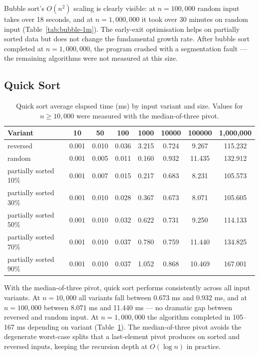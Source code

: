 \documentclass[11pt,a4paper]{article}
\begin{document}
Bubble sort's \(O(n^2)\) scaling is clearly visible: at \(n=100{,}000\) random input takes over 18 seconds, and at \(n=1{,}000{,}000\) it took over 30 minutes on random input (Table~\ref{tab:bubble-1m}). The early-exit optimisation helps on partially sorted data but does not change the fundamental growth rate. After bubble sort completed at \(n=1{,}000{,}000\), the program crashed with a segmentation fault --- the remaining algorithms were not measured at this size.

\subsection{Quick Sort}
\begin{table}[H]
\centering
\footnotesize
\begin{tabular}{lccccccc}
\toprule
Variant & 10 & 50 & 100 & 1000 & 10000 & 100000 & 1{,}000{,}000 \\
\midrule
reversed & 0.001 & 0.010 & 0.036 & 3.215 & 0.724 & 9.267 & 115.232 \\
random & 0.001 & 0.005 & 0.011 & 0.160 & 0.932 & 11.435 & 132.912 \\
partially sorted 10\% & 0.001 & 0.007 & 0.015 & 0.217 & 0.683 & 8.231 & 105.573 \\
partially sorted 30\% & 0.001 & 0.010 & 0.028 & 0.367 & 0.673 & 8.071 & 105.605 \\
partially sorted 50\% & 0.001 & 0.010 & 0.032 & 0.622 & 0.731 & 9.250 & 114.133 \\
partially sorted 70\% & 0.001 & 0.010 & 0.037 & 0.780 & 0.759 & 11.440 & 134.825 \\
partially sorted 90\% & 0.001 & 0.010 & 0.037 & 1.052 & 0.868 & 10.469 & 167.001 \\
\bottomrule
\end{tabular}
\caption{Quick sort average elapsed time (ms) by input variant and size. Values for \(n \geq 10{,}000\) were measured with the median-of-three pivot.}
\label{tab:quick-results}
\end{table}

With the median-of-three pivot, quick sort performs consistently across all input variants. At \(n=10{,}000\) all variants fall between 0.673 ms and 0.932 ms, and at \(n=100{,}000\) between 8.071 ms and 11.440 ms --- no dramatic gap between reversed and random input. At \(n=1{,}000{,}000\) the algorithm completed in 105--167 ms depending on variant (Table~\ref{tab:quick-results}). The median-of-three pivot avoids the degenerate worst-case splits that a last-element pivot produces on sorted and reversed inputs, keeping the recursion depth at \(O(\log n)\) in practice.
\end{document}

